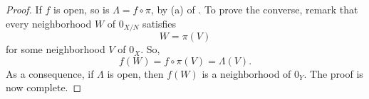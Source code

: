 \begin{proof}
If $f$ is open, so is $\Lambda = f\circ \pi$, by (a) of .
%
To prove the converse, remark that every neighborhood $W$ of $0_{X/N}$ satisfies
%
\begin{equation}
  W = \pi(V)
\end{equation}
%
for some neighborhood $V$ of $0_X$. So,
%
\begin{equation}
  f(W) = f \circ \pi(V) = \Lambda(V).
\end{equation}
%
As a consequence, if $\Lambda$ is open, then $f(W)$ is a neighborhood of $0_Y$. The proof is now complete. %
\end{proof}
%
